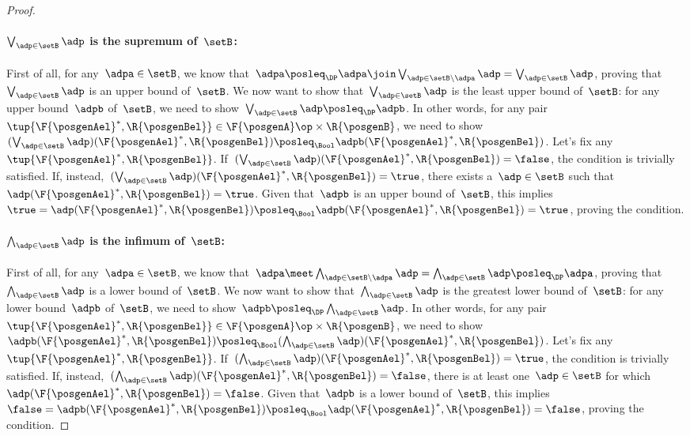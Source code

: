 \begin{proof}
    \paragraph*{$\bigvee_{\adp \in \setB} \adp$ is the supremum of~$\setB$:}
    First of all, for any~$\adpa\in \setB$, we know that~$\adpa\posleq_\DP \adpa \join \bigvee_{\adp \in \setB \backslash \adpa} \adp= \bigvee_{\adp \in \setB} \adp$, proving that~$\bigvee_{\adp \in \setB} \adp$ is an upper bound of~$\setB$.
    We now want to show that~$\bigvee_{\adp \in \setB} \adp$ is the least upper bound of~$\setB$: for any upper bound~$\adpb$ of~$\setB$, we need to show~$\bigvee_{\adp \in \setB} \adp \posleq_\DP\adpb$.
    In other words, for any pair~$\tup{\F{\posgenAel}^*,\R{\posgenBel}}\in \F{\posgenA}\op\times \R{\posgenB}$, we need to show~$(\bigvee_{\adp \in \setB} \adp)(\F{\posgenAel}^*,\R{\posgenBel})\posleq_\Bool \adpb(\F{\posgenAel}^*,\R{\posgenBel})$.
    Let's fix any~$\tup{\F{\posgenAel}^*,\R{\posgenBel}}$.
    If~$(\bigvee_{\adp \in \setB} \adp)(\F{\posgenAel}^*,\R{\posgenBel})=\false$, the condition is trivially satisfied.
    If, instead,~$(\bigvee_{\adp \in \setB} \adp)(\F{\posgenAel}^*,\R{\posgenBel})=\true$, there exists a~$\adp\in \setB$ such that~$\adp(\F{\posgenAel}^*,\R{\posgenBel})=\true$.
    Given that~$\adpb$ is an upper bound of~$\setB$, this implies~$\true=\adp(\F{\posgenAel}^*,\R{\posgenBel})\posleq_\Bool \adpb(\F{\posgenAel}^*,\R{\posgenBel})=\true$, proving the condition.

    \paragraph*{$\bigwedge_{\adp \in \setB} \adp$ is the infimum of~$\setB$:}
    First of all, for any~$\adpa\in \setB$, we know that~$\adpa \meet \bigwedge_{\adp \in \setB \backslash \adpa} \adp= \bigwedge_{\adp \in \setB} \adp \posleq_\DP \adpa$, proving that~$\bigwedge_{\adp \in \setB} \adp$ is a lower bound of~$\setB$.
    We now want to show that~$\bigwedge_{\adp \in \setB} \adp$ is the greatest lower bound of~$\setB$: for any lower bound~$\adpb$ of~$\setB$, we need to show~$\adpb\posleq_\DP\bigwedge_{\adp \in \setB} \adp $.
    In other words, for any pair~$\tup{\F{\posgenAel}^*,\R{\posgenBel}}\in \F{\posgenA}\op\times \R{\posgenB}$, we need to show~$\adpb(\F{\posgenAel}^*,\R{\posgenBel}) \posleq_\Bool (\bigwedge_{\adp \in \setB} \adp)(\F{\posgenAel}^*,\R{\posgenBel})$.
    Let's fix any~$\tup{\F{\posgenAel}^*,\R{\posgenBel}}$.
    If~$(\bigwedge_{\adp \in \setB} \adp)(\F{\posgenAel}^*,\R{\posgenBel})=\true$, the condition is trivially satisfied.
    If, instead,~$(\bigwedge_{\adp \in \setB} \adp)(\F{\posgenAel}^*,\R{\posgenBel})=\false$, there is at least one~$\adp\in \setB$ for which~$\adp(\F{\posgenAel}^*,\R{\posgenBel})=\false$.
    Given that~$\adpb$ is a lower bound of~$\setB$, this implies~$\false=\adpb(\F{\posgenAel}^*,\R{\posgenBel})\posleq_\Bool \adp(\F{\posgenAel}^*,\R{\posgenBel})=\false$, proving the condition.
\end{proof}

